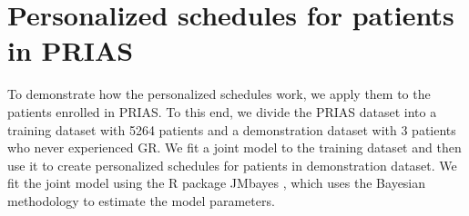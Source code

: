 
\section{Personalized schedules for patients in PRIAS}
\label{sec : pers_schedule_PRIAS}
To demonstrate how the personalized schedules work, we apply them to the patients enrolled in PRIAS. To this end, we divide the PRIAS dataset into a training dataset with 5264 patients and a demonstration dataset with 3 patients who never experienced GR. We fit a joint model to the training dataset and then use it to create personalized schedules for patients in demonstration dataset. We fit the joint model using the R package JMbayes \citep{rizopoulosJMbayes}, which uses the Bayesian methodology to estimate the model parameters.

